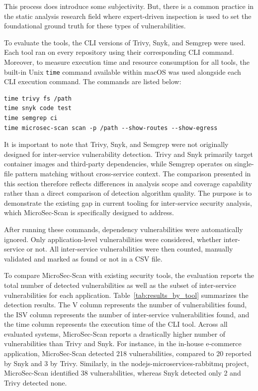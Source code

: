 \documentclass[preprint,12pt]{elsarticle}
\begin{document}
This process does introduce some subjectivity. But, there is a common practice in the static analysis research field where expert-driven inspection is used to set the foundational ground truth for these types of vulnerabilities.

To evaluate the tools, the CLI versions of Trivy, Snyk, and Semgrep were used. Each tool ran on every repository using their corresponding CLI command. Moreover, to measure execution time and resource consumption for all tools, the
built-in Unix \texttt{time} command available within macOS was used alongside each
CLI execution command.
The commands are listed below:
\begin{verbatim}
time trivy fs /path
time snyk code test
time semgrep ci
time microsec-scan scan -p /path --show-routes --show-egress
\end{verbatim}

It is important to note that Trivy, Snyk, and Semgrep were not originally designed for inter-service vulnerability detection. Trivy and Snyk primarily target container images and third-party dependencies, while Semgrep operates on single-file pattern matching without cross-service context. The comparison presented in this section therefore reflects differences in analysis scope and coverage capability rather than a direct comparison of detection algorithm quality. The purpose is to demonstrate the existing gap in current tooling for inter-service security analysis, which MicroSec-Scan is specifically designed to address.

After running these commands, dependency vulnerabilities were automatically ignored. Only application-level vulnerabilities were considered, whether inter-service or not.
All inter-service vulnerabilities were then counted, manually validated and marked as found or not in a CSV file.

To compare MicroSec-Scan with existing security tools, the evaluation reports the total number of detected vulnerabilities as well as the subset of inter-service vulnerabilities for each application. Table~\ref{tab:results_by_tool} summarizes the detection results. The V column represents the number of vulnerabilities found, the ISV column represents the number of inter-service vulnerabilities found, and the time column represents the execution time of the CLI tool. Across all evaluated systems, MicroSec-Scan reports a drastically higher number of vulnerabilities than Trivy and Snyk. For instance, in the in-house e-commerce application, MicroSec-Scan detected 218 vulnerabilities, compared to 20 reported by Snyk and 3 by Trivy. Similarly, in the nodejs-microservices-rabbitmq project, MicroSec-Scan identified 38 vulnerabilities, whereas Snyk detected only 2 and Trivy detected none.
\end{document}
